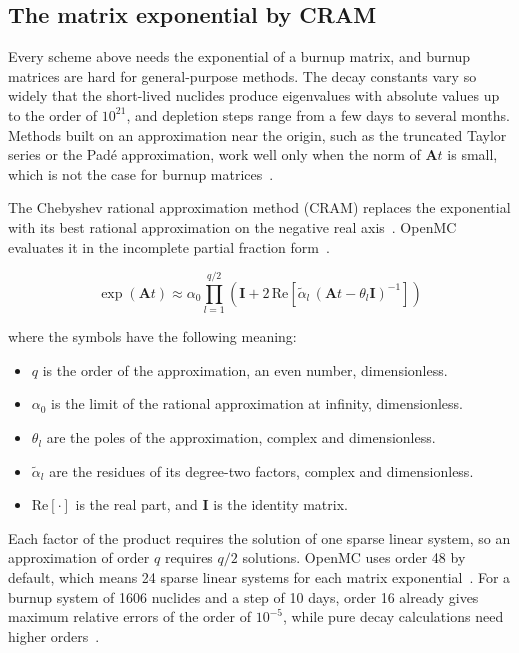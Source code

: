 \subsection{The matrix exponential by CRAM}
\label{sec:bg-dep-cram}

Every scheme above needs the exponential of a burnup matrix, and burnup
matrices are hard for general-purpose methods. The decay constants vary
so widely that the short-lived nuclides produce eigenvalues with
absolute values up to the order of $10^{21}$, and depletion steps range
from a few days to several months. Methods built on an approximation
near the origin, such as the truncated Taylor series or the Pad\'e
approximation, work well only when the norm of $\mathbf{A}t$ is small,
which is not the case for burnup matrices~\cite{pusa_2016}.

The Chebyshev rational approximation method (CRAM) replaces the
exponential with its best rational approximation on the negative real
axis~\cite{pusa_2016}. OpenMC evaluates it in the incomplete partial
fraction form~\cite{romano_2021_depletion}.

\begin{equation}
\exp(\mathbf{A}t) \approx \alpha_0 \prod_{l=1}^{q/2}
\left(\mathbf{I} + 2\,\mathrm{Re}\!\left[\tilde{\alpha}_l\,
(\mathbf{A}t - \theta_l\mathbf{I})^{-1}\right]\right)
\label{eq:cram}
\end{equation}

\noindent where the symbols have the following meaning:

\begin{itemize}
  \item $q$ is the order of the approximation, an even number,
        dimensionless.

  \item $\alpha_0$ is the limit of the rational approximation at
        infinity, dimensionless.

  \item $\theta_l$ are the poles of the approximation, complex and
        dimensionless.

  \item $\tilde{\alpha}_l$ are the residues of its degree-two factors,
        complex and dimensionless.

  \item $\mathrm{Re}[\cdot]$ is the real part, and $\mathbf{I}$ is the
        identity matrix.
\end{itemize}

Each factor of the product requires the solution of one sparse linear
system, so an approximation of order $q$ requires $q/2$ solutions.
OpenMC uses order 48 by default, which means 24 sparse linear systems for
each matrix exponential~\cite{romano_2021_depletion}. For a burnup system
of 1606 nuclides and a step of 10 days, order 16 already gives maximum
relative errors of the order of $10^{-5}$, while pure decay calculations
need higher orders~\cite{pusa_2016}.

